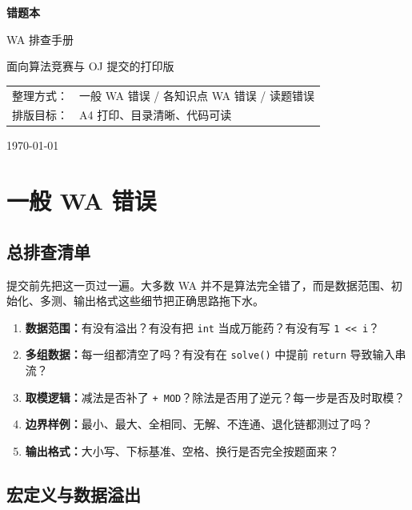 \documentclass[UTF8,openany,oneside,zihao=-4]{ctexbook}
\newcommand{\note}[1]{%
  \vspace{0.35em}
  \noindent\colorbox{softblue}{%
    \parbox{\dimexpr\linewidth-2\fboxsep}{\textcolor{ink}{#1}}}%
  \vspace{0.35em}
}
\begin{document}
\begin{titlepage}
  \centering
  \vspace*{2.3cm}
  {\Huge\bfseries 错题本\par}
  \vspace{0.5cm}
  {\LARGE WA 排查手册\par}
  \vspace{1.2cm}
  {\large 面向算法竞赛与 OJ 提交的打印版\par}
  \vfill
  \begin{tabular}{rl}
    整理方式： & 一般 WA 错误 / 各知识点 WA 错误 / 读题错误 \\
    排版目标： & A4 打印、目录清晰、代码可读 \\
  \end{tabular}
  \vfill
  {\large \today\par}
\end{titlepage}

\tableofcontents
\clearpage

\chapter{一般 WA 错误}

\section{总排查清单}

\note{提交前先把这一页过一遍。大多数 WA 并不是算法完全错了，而是数据范围、初始化、多测、输出格式这些细节把正确思路拖下水。}

\begin{enumerate}
  \item \textbf{数据范围：}有没有溢出？有没有把 \lstinline!int! 当成万能药？有没有写 \lstinline!1 << i!？
  \item \textbf{多组数据：}每一组都清空了吗？有没有在 \lstinline!solve()! 中提前 \lstinline!return! 导致输入串流？
  \item \textbf{取模逻辑：}减法是否补了 \lstinline!+ MOD!？除法是否用了逆元？每一步是否及时取模？
  \item \textbf{边界样例：}最小、最大、全相同、无解、不连通、退化链都测过了吗？
  \item \textbf{输出格式：}大小写、下标基准、空格、换行是否完全按题面来？
\end{enumerate}

\section{宏定义与数据溢出}
\end{document}
